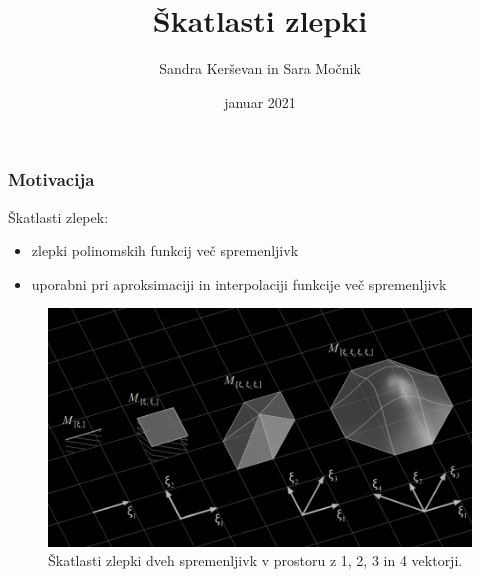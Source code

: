 \documentclass{beamer}
\title{Škatlasti zlepki}
\author[Sandra Kerševan, Sara Močnik]{Sandra Kerševan in Sara Močnik}
\institute{Fakulteta za matematiko in fiziko \\
Oddelek za matematiko}
\date{januar 2021}
\begin{document}

\begin{frame}
\titlepage
\end{frame}


\begin{frame}

\frametitle{Motivacija}

Škatlasti zlepek:
\begin{itemize}
\item zlepki polinomskih funkcij več spremenljivk
\item uporabni pri aproksimaciji in interpolaciji funkcije več spremenljivk
\end{itemize}

\begin{figure}
    \centering
    \includegraphics[scale=0.3]{boxsplines}
    \caption{Škatlasti zlepki dveh spremenljivk v prostoru z 1, 2, 3 in 4 vektorji.}
\end{figure}

\end{frame}

\end{document}
